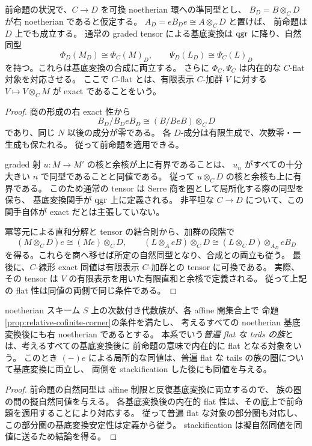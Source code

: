 \begin{proposition}
\label{prop:relative-corner-basechange}
前命題の状況で、$C\to D$ を可換 noetherian 環への準同型とし、
$B_D=B\otimes_CD$ が右 noetherian であると仮定する。
$A_D=eB_De\cong A\otimes_CD$ と置けば、
前命題は $D$ 上でも成立する。
通常の graded tensor による基底変換は $\operatorname{qgr}$ に降り、自然同型
\[
 \Phi_D(M_D)\cong\Phi_C(M)_D,\qquad
 \Psi_D(L_D)\cong\Psi_C(L)_D
\]
を持つ。これらは基底変換の合成に両立する。
さらに $\Phi_C,\Psi_C$ は内在的な $C$-flat 対象を対応させる。
ここで $C$-flat とは、有限表示 $C$-加群 $V$ に対する
$V\mapsto V\otimes_C M$ が exact であることをいう。
\end{proposition}
\begin{proof}
商の形成の右 exact 性から
\[
 B_D/B_DeB_D\cong(B/BeB)\otimes_CD
\]
であり、同じ $N$ 以後の成分が零である。
各 $D$-成分は有限生成で、次数零・一生成も保たれる。
従って前命題を適用できる。

graded 射 $u:M\to M'$ の核と余核が上に有界であることは、
$u_n$ がすべての十分大きい $n$ で同型であることと同値である。
従って $u\otimes_CD$ の核と余核も上に有界である。
このため通常の tensor は Serre 商を圏として局所化する際の同型を保ち、
基底変換関手が $\operatorname{qgr}$ 上に定義される。
非平坦な $C\to D$ について、この関手自体が exact だとは主張していない。

冪等元による直和分解と tensor の結合則から、加群の段階で
\[
 (M\otimes_CD)e\cong(Me)\otimes_CD,
 \qquad
 (L\otimes_AeB)\otimes_CD
 \cong(L\otimes_CD)\otimes_{A_D}eB_D
\]
を得る。これらを商へ移せば所定の自然同型となり、合成との両立も従う。
最後に、$C$-線形 exact 同値は有限表示 $C$-加群との tensor に可換である。
実際、その tensor は $V$ の有限表示を用いた有限直和と余核で定義される。
従って上記の flat 性は同値の両側で同じ条件である。
\end{proof}

\begin{corollary}
\label{cor:relative-corner-family}
noetherian スキーム $S$ 上の次数付き代数族が、各 affine 開集合上で
命題\ref{prop:relative-cofinite-corner}の条件を満たし、
考えるすべての noetherian 基底変換後にも右 noetherian であるとする。
本系でいう\emph{普遍 flat な tails の族}とは、考えるすべての基底変換後に
前命題の意味で内在的に flat となる対象をいう。
このとき $(-)e$ による局所的な同値は、普遍 flat な tails の族の圏について基底変換に両立し、
両側を stackification した後にも同値を与える。
\end{corollary}
\begin{proof}
前命題の自然同型は affine 制限と反復基底変換に両立するので、
族の圏の間の擬自然同値を与える。
各基底変換後の内在的 flat 性は、その底上で前命題を適用することにより対応する。
従って普遍 flat な対象の部分圏も対応し、この部分圏の基底変換安定性は定義から従う。
stackification は擬自然同値を同値に送るため結論を得る。
\end{proof}

